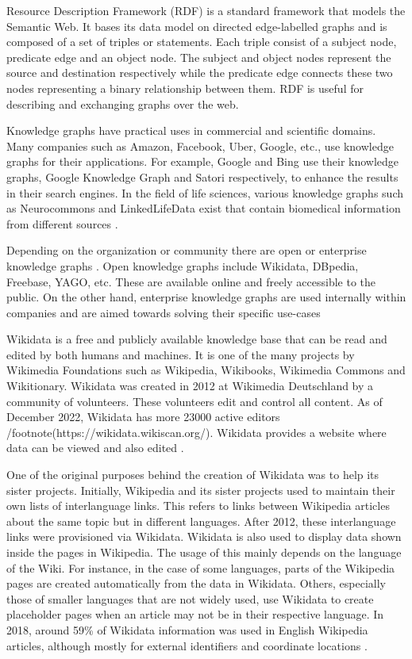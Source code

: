 Resource Description Framework (RDF) is a standard framework that models the Semantic Web. It bases its data model on directed edge-labelled graphs and is composed of a set of triples or statements. Each triple consist of a subject node, predicate edge and an object node. The subject and object nodes represent the source and destination respectively while the predicate edge connects these two nodes representing a binary relationship between them. RDF is useful for describing and exchanging graphs over the web. 

Knowledge graphs have practical uses in commercial and scientific domains. Many companies such as Amazon, Facebook, Uber, Google, etc., use knowledge graphs for their applications. For example, Google and Bing use their knowledge graphs, Google Knowledge Graph and Satori respectively, to enhance the results in their search engines. In the field of life sciences, various knowledge graphs such as Neurocommons and LinkedLifeData exist that contain biomedical information from different sources \cite{Nickel2015}. 

Depending on the organization or community there are open or enterprise knowledge graphs \cite{Hogan2021}. Open knowledge graphs include Wikidata, DBpedia, Freebase, YAGO, etc. These are available online and freely accessible to the public. On the other hand, enterprise knowledge graphs are used internally within companies and are aimed towards solving their specific use-cases

Wikidata is a free and publicly available knowledge base that can be read and edited by both humans and machines. It is one of the many projects by Wikimedia Foundations such as Wikipedia, Wikibooks, Wikimedia Commons and Wikitionary. Wikidata was created in 2012 at Wikimedia Deutschland by a community of volunteers. These volunteers edit and control all content. As of December 2022, Wikidata has more 23000 active editors /footnote(https://wikidata.wikiscan.org/). Wikidata provides a website where data can be viewed and also edited \cite{Foundationa}. 

One of the original purposes behind the creation of Wikidata was to help its sister projects. Initially, Wikipedia and its sister projects used to maintain their own lists of interlanguage links. This refers to links between Wikipedia articles about the same topic but in different languages. After 2012, these interlanguage links were provisioned via Wikidata. Wikidata is also used to display data shown inside the pages in Wikipedia. The usage of this mainly depends on the language of the Wiki. For instance, in the case of some languages, parts of the Wikipedia pages are created automatically from the data in Wikidata. Others, especially those of smaller languages that are not widely used, use Wikidata to create placeholder pages when an article may not be in their respective language. In 2018, around 59\% of Wikidata information was used in English Wikipedia articles, although mostly for external identifiers and coordinate locations \cite{Wikipedia2017}. 


